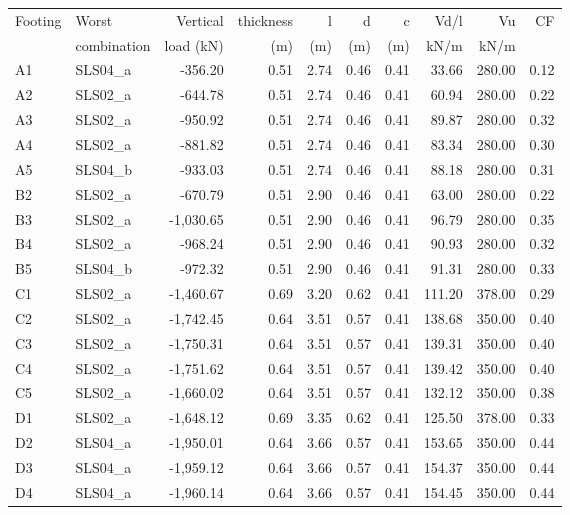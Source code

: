 \begin{table}
\begin{center}
  \begin{scriptsize}
\begin{tabular}{|l|l|r|r|r|r|r|r|r|r|}
\hline
Footing & Worst & Vertical & thickness & l & d & c & Vd/l & Vu & CF\\
 & combination & load (kN) & (m) & (m) & (m) & (m) & kN/m & kN/m & \\
\hline
 A1 &  SLS04\_a & -356.20 & 0.51 & 2.74 & 0.46 & 0.41 & 33.66 & 280.00 & 0.12\\
 A2 &  SLS02\_a & -644.78 & 0.51 & 2.74 & 0.46 & 0.41 & 60.94 & 280.00 & 0.22\\
 A3 &  SLS02\_a & -950.92 & 0.51 & 2.74 & 0.46 & 0.41 & 89.87 & 280.00 & 0.32\\
 A4 &  SLS02\_a & -881.82 & 0.51 & 2.74 & 0.46 & 0.41 & 83.34 & 280.00 & 0.30\\
 A5 &  SLS04\_b & -933.03 & 0.51 & 2.74 & 0.46 & 0.41 & 88.18 & 280.00 & 0.31\\
 B2 &  SLS02\_a & -670.79 & 0.51 & 2.90 & 0.46 & 0.41 & 63.00 & 280.00 & 0.22\\
 B3 &  SLS02\_a & -1,030.65 & 0.51 & 2.90 & 0.46 & 0.41 & 96.79 & 280.00 & 0.35\\
 B4 &  SLS02\_a & -968.24 & 0.51 & 2.90 & 0.46 & 0.41 & 90.93 & 280.00 & 0.32\\
 B5 &  SLS04\_b & -972.32 & 0.51 & 2.90 & 0.46 & 0.41 & 91.31 & 280.00 & 0.33\\
 C1 &  SLS02\_a & -1,460.67 & 0.69 & 3.20 & 0.62 & 0.41 & 111.20 & 378.00 & 0.29\\
 C2 &  SLS02\_a & -1,742.45 & 0.64 & 3.51 & 0.57 & 0.41 & 138.68 & 350.00 & 0.40\\
 C3 &  SLS02\_a & -1,750.31 & 0.64 & 3.51 & 0.57 & 0.41 & 139.31 & 350.00 & 0.40\\
 C4 &  SLS02\_a & -1,751.62 & 0.64 & 3.51 & 0.57 & 0.41 & 139.42 & 350.00 & 0.40\\
 C5 &  SLS02\_a & -1,660.02 & 0.64 & 3.51 & 0.57 & 0.41 & 132.12 & 350.00 & 0.38\\
 D1 &  SLS02\_a & -1,648.12 & 0.69 & 3.35 & 0.62 & 0.41 & 125.50 & 378.00 & 0.33\\
 D2 &  SLS04\_a & -1,950.01 & 0.64 & 3.66 & 0.57 & 0.41 & 153.65 & 350.00 & 0.44\\
 D3 &  SLS04\_a & -1,959.12 & 0.64 & 3.66 & 0.57 & 0.41 & 154.37 & 350.00 & 0.44\\
 D4 &  SLS04\_a & -1,960.14 & 0.64 & 3.66 & 0.57 & 0.41 & 154.45 & 350.00 & 0.44\\

\end{tabular}
\end{scriptsize}
\end{center}
\end{table}
